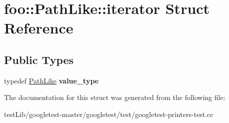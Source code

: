 \hypertarget{structfoo_1_1PathLike_1_1iterator}{}\section{foo\+:\+:Path\+Like\+:\+:iterator Struct Reference}
\label{structfoo_1_1PathLike_1_1iterator}
\subsection*{Public Types}
\begin{DoxyCompactItemize}
\item 
\mbox{\label{structfoo_1_1PathLike_1_1iterator_a797c204878a09e04b23cfe6b48ac7016}} 
typedef \hyperlink{classfoo_1_1PathLike}{Path\+Like} {\bfseries value\+\_\+type}
\end{DoxyCompactItemize}


The documentation for this struct was generated from the following file\+:\begin{DoxyCompactItemize}
\item 
test\+Lib/googletest-\/master/googletest/test/googletest-\/printers-\/test.\+cc\end{DoxyCompactItemize}
